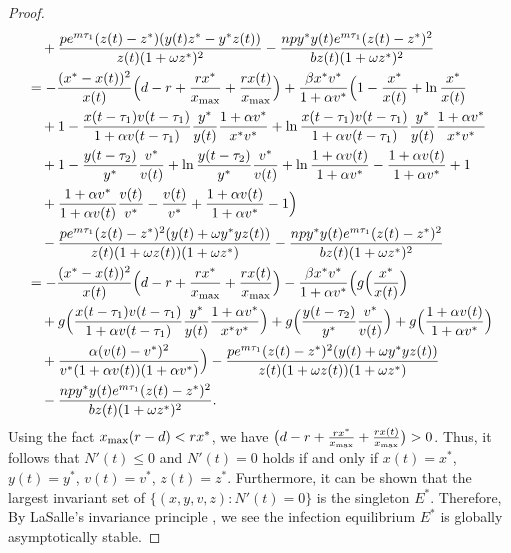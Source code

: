 \documentclass[reqno]{amsart}
\begin{document}
\begin{proof}
\begin{align*}
&\quad +\frac{pe^{m\tau_1}(z(t)-z^{*})(y(t)z^{*}-y^{*}z(t))}{z(t)(1+\omega z^{*})^{2}}
 -\frac{npy^{*}y(t)e^{m\tau_1}(z(t)-z^{*})^{2}}{bz(t)(1+\omega z^{*})^{2}} \\
&= -\frac{(x^{*}-x(t))^{2}}{x(t)}\Big(d-r+\frac{rx^{*}}{x_{\rm max}}
 +\frac{rx(t)}{x_{\rm max}}\Big)+\frac{\beta x^{*}v^{*}}{1+\alpha v^{*}}
 \Big(1-\frac{x^{*}}{x(t)}+\ln\frac{x^{*}}{x(t)} \\
&\quad +1-\frac{ x(t-\tau_{1})v(t-\tau_{1})}{1+\alpha v(t-\tau_{1})}
 \frac{y^{*}}{y(t)}\frac{1+\alpha v^{*}}{x^{*}v^{*}}
 +\ln\frac{ x(t-\tau_{1})v(t-\tau_{1})}{1+\alpha v(t-\tau_{1})}\frac{y^{*}}{y(t)}
 \frac{1+\alpha v^{*}}{x^{*}v^{*}} \\
&\quad +1-\frac{y(t-\tau_{2})}{y^{*}}\frac{v^{*}}{v(t)}+\ln\frac{y(t-\tau_{2})}{y^{*}}\frac{v^{*}}{v(t)}+\ln\frac{1+\alpha v(t)}{1+\alpha v^{*}}
-\frac{1+\alpha v(t)}{1+\alpha v^{*}}+1 \\
&\quad +\frac{1+\alpha v^{*}}{1+\alpha v(t)}\frac{v(t)}{v^{*}}
 -\frac{v(t)}{v^{*}}+\frac{1+\alpha v(t)}{1+\alpha v^{*}}-1\Big)\\
&\quad -\frac{pe^{m\tau_1}(z(t)-z^{*})^{2}(y(t)+\omega y^{*}yz(t))}{z(t)
 (1+\omega z(t))(1+\omega z^{*})}
 -\frac{npy^{*}y(t)e^{m\tau_1}(z(t)-z^{*})^{2}}{bz(t)(1+\omega z^{*})^{2}} \\
&= -\frac{(x^{*}-x(t))^{2}}{x(t)}\Big(d-r+\frac{rx^{*}}{x_{\rm max}}
 +\frac{rx(t)}{x_{\rm max}}\Big)
 -\frac{\beta x^{*}v^{*}}{1+\alpha v^{*}}\Big(g\Big(\frac{x^{*}}{x(t)}\Big) \\
&\quad +g\Big(\frac{ x(t-\tau_{1})v(t-\tau_{1})}{1+\alpha v(t-\tau_{1})}
 \frac{y^{*}}{y(t)}\frac{1+\alpha v^{*}}{x^{*}v^{*}}\Big)
 +g\Big(\frac{y(t-\tau_{2})}{y^{*}}\frac{v^{*}}{v(t)}\Big)
 +g\Big(\frac{1+\alpha v(t)}{1+\alpha v^{*}}\Big)\\
&\quad +\frac{\alpha(v(t)-v^{*})^{2}}{v^{*}(1+\alpha v(t))(1+\alpha v^{*})} \Big)
 -\frac{pe^{m\tau_1}(z(t)-z^{*})^{2}(y(t)+\omega y^{*}yz(t))}{z(t)(1+\omega z(t))
  (1+\omega z^{*})}\\
&\quad -\frac{npy^{*}y(t)e^{m\tau_1}(z(t)-z^{*})^{2}}{bz(t)(1+\omega z^{*})^{2}}.
\end{align*}
Using the fact $x_{\rm max}(r-d)<rx^{*}$, we have 
$\big(d-r+\frac{rx^{*}}{x_{\rm max}}+\frac{rx(t)}{x_{\rm max}}\big)>0$. 
Thus, it follows that $N'(t)\leq 0$ and
$N'(t)= 0$  holds if and only if  $x(t)=x^{*}$, $y(t)=y^{*}$, $v(t)=v^{*}$, 
$z(t)=z^{*}$.
Furthermore, it can be shown that the largest invariant set of 
$\{(x,y,v,z)\!:  N'(t)=0\}$ is the singleton $E^*$. Therefore, 
By LaSalle's invariance  principle \cite{HV}, we see the infection equilibrium  
$ E^{*}$ is  globally asymptotically stable.
\end{proof}
\end{document}
